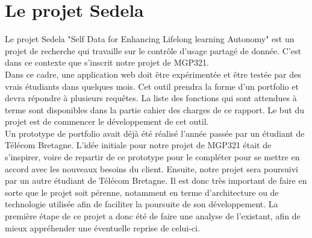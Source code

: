 \section{Le projet Sedela}

Le projet Sedela "Self Data for Enhancing Lifelong learning Autonomy" est un projet de recherche qui travaille sur le contrôle d'usage partagé de donnée. C'est dans ce contexte que s'inscrit notre projet de MGP321. \\

Dans ce cadre, une application web doit être expérimentée et être testée par des vrais étudiants dans quelques mois. Cet outil prendra la forme d'un portfolio et devra répondre à plusieurs requêtes. La liste des fonctions qui sont attendues à terme sont disponibles dans la partie cahier des charges de ce rapport. Le but du projet est de commencer le développement de cet outil. \\

Un prototype de portfolio avait déjà été réalisé l'année passée par un étudiant de Télécom Bretagne. L'idée initiale pour notre projet de MGP321 était de s'inspirer, voire de repartir de ce prototype pour le compléter pour se mettre en accord avec les nouveaux besoins du client. Ensuite, notre projet sera poursuivi par un autre étudiant de Télécom Bretagne. Il est donc très important de faire en sorte que le projet soit pérenne, notamment en terme d'architecture ou de technologie utilisée afin de faciliter la poursuite de son développement. La première étape de ce projet a donc été de faire une analyse de l'existant, afin de mieux appréhender une éventuelle reprise de celui-ci.





